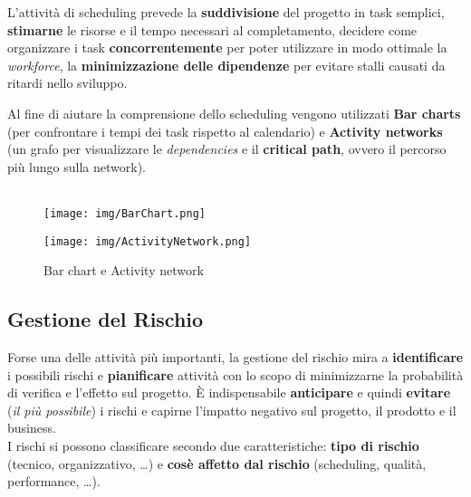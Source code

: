 L'attivit\`a di scheduling prevede la \textbf{suddivisione} del progetto
in task semplici, \textbf{stimarne} le risorse e il tempo necessari al
completamento, decidere come organizzare i task \textbf{concorrentemente}
per poter utilizzare in modo ottimale la \textit{workforce},
la \textbf{minimizzazione delle dipendenze} per evitare stalli causati
da ritardi nello sviluppo.

Al fine di aiutare la comprensione dello scheduling vengono utilizzati
\textbf{Bar charts} (per confrontare i tempi dei task rispetto al
calendario) e \textbf{Activity networks} (un grafo per visualizzare le
\textit{dependencies} e il \textbf{critical path}, ovvero il percorso
pi\`u lungo sulla network).\\~\\

\begin{figure}[H]
\begin{center}
    \texttt{[image: img/BarChart.png]}
    
    \vspace{2cm}
    
    \texttt{[image: img/ActivityNetwork.png]}

    \caption*{Bar chart e Activity network}
\end{center}
\end{figure}

\subsection{Gestione del Rischio}

Forse una delle attivit\`a pi\`u importanti, la gestione del rischio
mira a \textbf{identificare} i possibili rischi e \textbf{pianificare}
attivit\`a con lo scopo di minimizzarne la probabilit\`a di verifica
e l'effetto sul progetto. \`E indispensabile \textbf{anticipare}
e quindi \textbf{evitare} (\textit{il pi\`u possibile}) i rischi
e capirne l'impatto negativo sul progetto, il prodotto e il business.\\

I rischi si possono classificare secondo due caratteristiche:
\textbf{tipo di rischio} (tecnico, organizzativo, \dots) e \textbf{cos\`e
affetto dal rischio} (scheduling, qualit\`a, performance, \dots).\\

